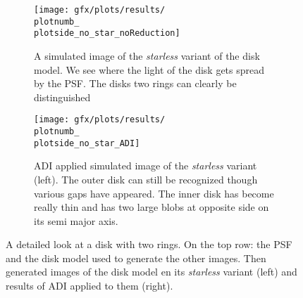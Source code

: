 \begin{figure}[!hbt]
{\begin{minipage}[t]{1.2\textwidth}
      \begin{subfigure}[t]{0.6\textwidth}
        \centering
        \texttt{[image: gfx/plots/results/\\plotnumb\_\\plotside\_no\_star\_noReduction]}
        \caption[]{A simulated image of the \textit{starless} variant of the disk model. We see where the light of the disk gets spread by the PSF. The disks two rings can clearly be distinguished}
      \end{subfigure}%
      \begin{subfigure}[t]{0.6\textwidth}
        \centering
        \texttt{[image: gfx/plots/results/\\plotnumb\_\\plotside\_no\_star\_ADI]}
        \caption[]{\ac{ADI} applied simulated image of the \textit{starless} variant (left). The outer disk can still be recognized though various gaps have appeared. The inner disk has become really thin and has two large blobs at opposite side on its semi major axis.}
      \end{subfigure}
  \end{minipage}
  }%

  \caption[]{A detailed look at a disk with two rings. On the top row: the \ac{PSF} and the disk model used to generate the other images. Then generated images of the disk model en its \textit{starless} variant (left) and results of \ac{ADI} applied to them (right).}
  \label{fig:\plotside:\plotnumb}
\end{figure}
